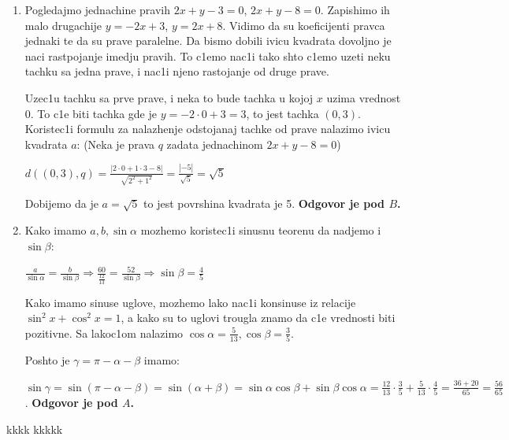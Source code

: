 \documentclass[a4paper,12pt]{article}
\begin{document}
\begin{enumerate}[1.]
\item Pogledajmo jednachine pravih $2x + y - 3 = 0$, $2x +y -8 = 0$. Zapishimo ih malo drugachije $y = -2x +3$, $y=  2x + 8$. Vidimo da su koeficijenti pravca jednaki te da su prave paralelne. Da bismo dobili ivicu kvadrata dovoljno je naci rastpojanje imedju pravih. To c1emo nac1i tako shto c1emo uzeti neku tachku sa jedna prave, i nac1i njeno rastojanje od druge prave.
\par Uzec1u tachku sa prve prave, i neka to bude tachka u kojoj $x$ uzima vrednost 0. To c1e biti tachka gde je $y = -2 \cdot 0 +3 = 3$, to jest tachka $(0,3)$. Koristec1i formulu za nalazhenje odstojanaj tachke od prave nalazimo ivicu kvadrata $a$: (Neka je prava $q$ zadata jednachinom $ 2x+y-8 = 0$)
\par $d((0,3), q) = \frac{|2 \cdot 0 + 1 \cdot 3 -8|}{\sqrt{2^2 + 1^2}} = \frac{|-5|}{\sqrt{5}} = \sqrt{5}$
\par Dobijemo da je $a = \sqrt{5}$ to jest povrshina kvadrata je 5. \textbf{Odgovor je pod $B$.} 


\item Kako imamo $a,b,\sin{\alpha} $ mozhemo koristec1i sinusnu teorenu da nadjemo i $\sin{\beta}$:
\par $ \frac{a}{\sin{\alpha}}= \frac{b}{\sin{\beta}}  \Longrightarrow \frac{60}{\frac{12}{13}}= \frac{52}{\sin{\beta}} \Longrightarrow \sin{\beta} = \frac{4}{5} $
\par Kako imamo sinuse uglove, mozhemo lako nac1i konsinuse iz relacije $\sin^2  x  +\cos^2  x  = 1$, a kako su to uglovi trougla znamo da c1e vrednosti biti pozitivne. Sa lakoc1om nalazimo $\cos{\alpha} = \frac{5}{13}, \cos{\beta} = \frac{3}{5} $.
\par Poshto je $\gamma = \pi - \alpha - \beta$ imamo: 
\par $\sin{\gamma} = \sin(\pi - \alpha - \beta)= \sin( \alpha + \beta) = \sin{\alpha}\cos{\beta} + \sin{\beta} \cos{\alpha} = \frac{12}{13}\cdot \frac{3}{5} + \frac{5}{13}  \cdot \frac{4}{5} = \frac{36+20}{65} = \frac{56}{65} $. \textbf{Odgovor je pod $A$.}


\end{enumerate}
\newpage


\begin{thebibliography}{9}
 kkkk
 kkkkk

\end{thebibliography}
\end{document}
